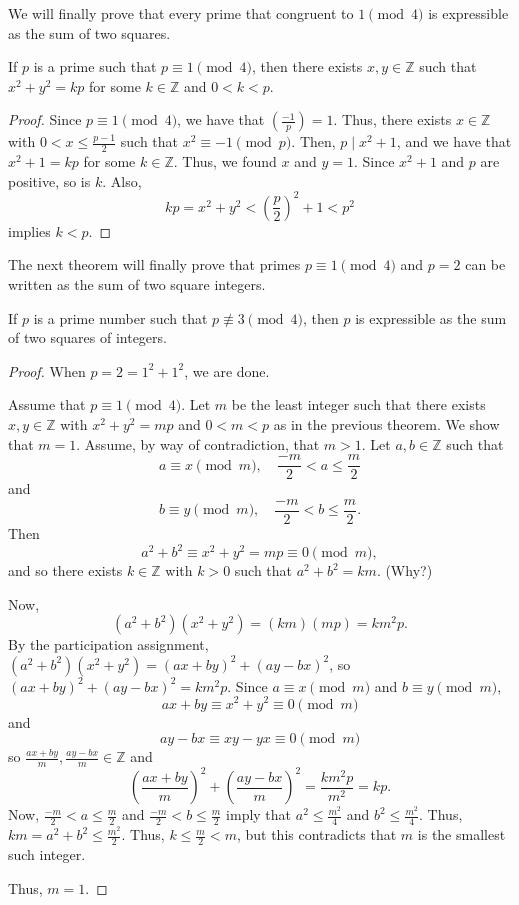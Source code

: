 \documentclass{ximera}
\begin{document}
We will finally prove that every prime that congruent to $1 \pmod 4$ is expressible as the sum of two squares.

\begin{theorem}
 If $p$ is a prime such that $p\equiv 1 \pmod 4$, then there exists $x,y\in\mathbb{Z}$ such that $x^2+y^2=kp$ for some $k\in\mathbb{Z}$ and $0<k<p$.
\end{theorem}
\begin{proof}
 Since $p\equiv 1 \pmod 4$, we have that $\left(\frac{-1}{p}\right)=1$. Thus, there exists $x\in\mathbb{Z}$ with $0<x\leq\frac{p-1}{2}$ such that $x^2\equiv -1 \pmod p$. Then, $p\mid x^2+1$, and we have that $x^2+1=kp$ for some $k\in\mathbb{Z}$. Thus, we found $x$ and $y=1$. Since $x^2+1$ and $p$ are positive, so is $k$. Also, \[kp=x^2+y^2<\left(\frac{p}{2}\right)^2+1<p^2\] implies $k<p$.
\end{proof}

The next theorem will finally prove that primes $p\equiv 1 \pmod 4$ and $p=2$ can be written as the sum of two square integers.

\begin{theorem}
 If $p$ is a prime number such that $p\not\equiv 3\pmod 4$, then $p$ is expressible as the sum of two squares of integers.
\end{theorem}
\begin{proof}
 When $p=2=1^2+1^2$, we are done.
 
 Assume that $p\equiv 1\pmod 4$. Let $m$ be the least integer such that there exists $x,y\in\mathbb{Z}$ with $x^2+y^2=mp$ and $0<m<p$ as in the previous theorem. We show that $m=1$. Assume, by way of contradiction, that $m>1$. Let $a,b\in\mathbb{Z}$ such that \[a\equiv x\pmod m,\quad \frac{-m}{2}<a\leq\frac{m}{2}\] and \[b\equiv y\pmod m,\quad \frac{-m}{2}<b\leq\frac{m}{2}.\] Then \[a^2+b^2\equiv x^2+y^2=mp\equiv 0\pmod m,\] and so there exists $k\in\mathbb{Z}$ with $k>0$ such that $a^2+b^2=km$. (Why?)
 
 Now, \[(a^2+b^2)(x^2+y^2)=(km)(mp)=km^2p.\] By the participation assignment, $(a^2+b^2)(x^2+y^2)=(ax+by)^2+(ay-bx)^2$, so $(ax+by)^2+(ay-bx)^2=km^2p$. Since $a\equiv x\pmod m$ and $b\equiv y\pmod m$, \[ax+by\equiv x^2+y^2\equiv0\pmod m\] and \[ay-bx\equiv xy-yx\equiv0\pmod m\] so $\frac{ax+by}{m},\frac{ay-bx}{m}\in\mathbb{Z}$ and \[\left(\frac{ax+by}{m}\right)^2+\left(\frac{ay-bx}{m}\right)^2=\frac{km^2p}{m^2}=kp.\]  Now, $\frac{-m}{2}<a\leq\frac{m}{2}$ and $\frac{-m}{2}<b\leq\frac{m}{2}$  imply that $a^2\leq\frac{m^2}{4}$ and $b^2\leq\frac{m^2}{4}$. Thus, $km=a^2+b^2\leq\frac{m^2}{2}$. Thus, $k\leq \frac{m}{2}<m$, but this contradicts that $m$ is the smallest such integer.
 
 Thus, $m=1$.
\end{proof}
\end{document}
